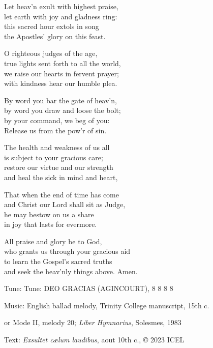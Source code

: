 \hymn

\begin{hymnverse}
Let heav’n exult with highest praise,\\
let earth with joy and gladness ring:\\
this sacred hour extols in song\\
the Apostles’ glory on this feast.

O righteous judges of the age,\\
true lights sent forth to all the world,\\
we raise our hearts in fervent prayer;\\
with kindness hear our humble plea.

By word you bar the gate of heav’n,\\
by word you draw and loose the bolt;\\
by your command, we beg of you:\\
Release us from the pow’r of sin.

The health and weakness of us all\\
is subject to your gracious care;\\
restore our virtue and our strength\\
and heal the sick in mind and heart,

That when the end of time has come\\
and Christ our Lord shall sit as Judge,\\
he may bestow on us a share\\
in joy that lasts for evermore.

All praise and glory be to God,\\
who grants us through your gracious aid\\
to learn the Gospel’s sacred truths\\
and seek the heav’nly things above. Amen.
\end{hymnverse}

\begin{hymnsource}
Tune: Tune: DEO GRACIAS (AGINCOURT), 8 8 8 8

Music: English ballad melody, Trinity College manuscript, 15th c.

or Mode II, melody 20; \emph{Liber Hymnarius}, Solesmes, 1983

Text: \emph{Exsultet cælum laudibus}, aout 10th c., © 2023 ICEL
\end{hymnsource}

